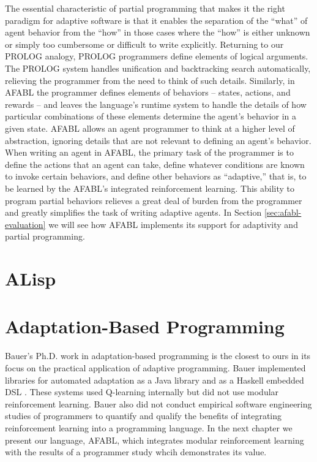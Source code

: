 The essential characteristic of partial programming that makes it the right paradigm for adaptive software is that it enables the separation of the ``what'' of agent behavior from the ``how'' in those cases where the ``how'' is either unknown or simply too cumbersome or difficult to write explicitly.  Returning to our PROLOG analogy, PROLOG programmers define elements of logical arguments.  The PROLOG system handles unification and backtracking search automatically, relieving the programmer from the need to think of such details. Similarly, in AFABL the programmer defines elements of behaviors -- states, actions, and rewards -- and leaves the language's runtime system to handle the details of how particular combinations of these elements determine the agent's behavior in a given state.  AFABL allows an agent programmer to think at a higher level of abstraction, ignoring details that are not relevant to defining an agent's behavior.  When writing an agent in AFABL, the primary task of the programmer is to define the actions that an agent can take, define whatever conditions are known to invoke certain behaviors, and define other behaviors as ``adaptive,'' that is, to be learned by the AFABL's integrated reinforcement learning.  This ability to program partial behaviors relieves a great deal of burden from the programmer and greatly simplifies the task of writing adaptive agents.  In Section \ref{sec:afabl-evaluation} we will see how AFABL implements its support for adaptivity and partial programming.


\section{ALisp}




\section{Adaptation-Based Programming}

Bauer's Ph.D. work in adaptation-based programming \cite{bauer2013adaptation} is the closest to ours in its focus on the practical application of adaptive programming. Bauer implemented libraries for automated adaptation as a Java library \cite{bauer2011adaptation} and as a Haskell embedded DSL \cite{bauer2011adaptation-haskell}. These systems used Q-learning internally but did not use modular reinforcement learning. Bauer also did not conduct empirical software engineering studies of programmers to quantify and qualify the benefits of integrating reinforcement learning into a programming language. In the next chapter we present our language, AFABL, which integrates modular reinforcement learning with the results of a programmer study whcih demonstrates its value.


